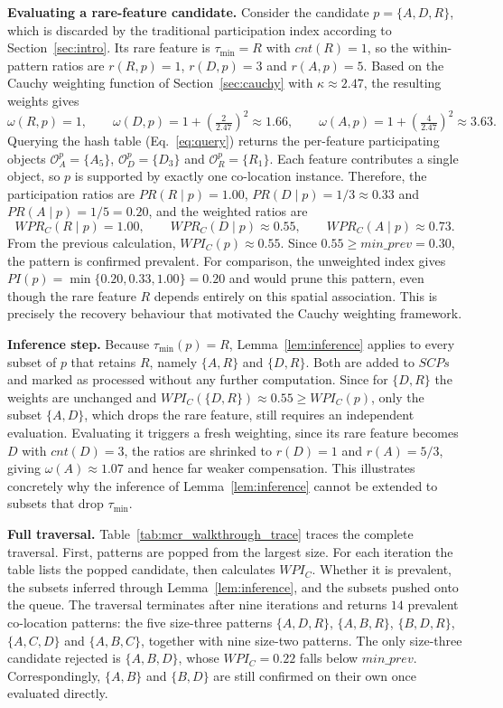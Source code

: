 \documentclass[12pt, letterpaper]{template}
\theoremstyle{definition}
\begin{document}
\noindent\textbf{Evaluating a rare-feature candidate.}
Consider the candidate $p = \{A,D,R\}$, which is discarded by the traditional participation index according to Section~\ref{sec:intro}. Its rare feature
is $\tau_{\min} = R$ with $cnt(R) = 1$, so the within-pattern ratios are
$r(R,p) = 1$, $r(D,p) = 3$ and $r(A,p) = 5$. Based on the Cauchy
weighting function of Section~\ref{sec:cauchy} with $\kappa \approx 2.47$, the resulting weights
gives
\[
\omega(R,p) = 1, \qquad
\omega(D,p) = 1 + \left(\tfrac{2}{2.47}\right)^{2} \approx 1.66, \qquad
\omega(A,p) = 1 + \left(\tfrac{4}{2.47}\right)^{2} \approx 3.63 .
\]
Querying the hash table (Eq.~\ref{eq:query}) returns the per-feature
participating objects $\mathcal{O}_A^p = \{A_5\}$,
$\mathcal{O}_D^p = \{D_3\}$ and $\mathcal{O}_R^p = \{R_1\}$. Each feature
contributes a single object, so $p$ is supported by exactly one co-location
instance. Therefore, the participation ratios are $PR(R \mid p) = 1.00$,
$PR(D \mid p) = 1/3 \approx 0.33$ and $PR(A \mid p) = 1/5 = 0.20$, and the
weighted ratios are
\[
WPR_C(R \mid p) = 1.00, \qquad
WPR_C(D \mid p) \approx 0.55, \qquad
WPR_C(A \mid p) \approx 0.73.
\]
From the previous calculation, $WPI_C(p) \approx 0.55$. Since $0.55 \ge min\_prev = 0.30$, the pattern is
confirmed prevalent. For comparison, the unweighted index gives
$PI(p) = \min\{0.20, 0.33, 1.00\} = 0.20$ and would prune this pattern, even
though the rare feature $R$ depends entirely on this spatial association.
This is precisely the recovery behaviour that motivated the Cauchy weighting
framework.

\noindent\textbf{Inference step.}
Because $\tau_{\min}(p) = R$, Lemma~\ref{lem:inference} applies to every
subset of $p$ that retains $R$, namely $\{A,R\}$ and $\{D,R\}$. Both are added
to $SCPs$ and marked as processed without any further computation. Since for $\{D,R\}$ the weights are unchanged and
$WPI_C(\{D,R\}) \approx 0.55 \ge WPI_C(p)$, only the subset $\{A,D\}$, which
drops the rare feature, still requires an independent evaluation. Evaluating it triggers a fresh weighting, since its rare feature
becomes $D$ with $cnt(D) = 3$, the ratios are shrinked to $r(D) = 1$ and
$r(A) = 5/3$, giving $\omega(A) \approx 1.07$ and hence far weaker
compensation. This illustrates concretely why the inference of
Lemma~\ref{lem:inference} cannot be extended to subsets that drop
$\tau_{\min}$.

\noindent\textbf{Full traversal.}
Table~\ref{tab:mcr_walkthrough_trace} traces the complete traversal. First, patterns
are popped from the largest size. For each iteration the table lists the
popped candidate, then calculates $WPI_C$. Whether
it is prevalent, the subsets inferred through Lemma~\ref{lem:inference}, and the subsets pushed onto the
queue. The traversal terminates
after nine iterations and returns $14$ prevalent co-location patterns: the
five size-three patterns $\{A,D,R\}$, $\{A,B,R\}$, $\{B,D,R\}$, $\{A,C,D\}$
and $\{A,B,C\}$, together with nine size-two patterns. The only size-three
candidate rejected is $\{A,B,D\}$, whose $WPI_C = 0.22$ falls below
$min\_prev$. Correspondingly, $\{A,B\}$ and $\{B,D\}$ are still confirmed on
their own once evaluated directly.
\end{document}
